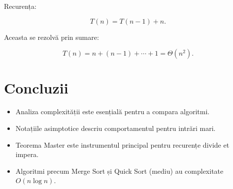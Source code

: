 \documentclass[12pt]{article}
\begin{document}
Recurența:


\[
T(n) = T(n-1) + n.
\]



Aceasta se rezolvă prin sumare:


\[
T(n) = n + (n-1) + \cdots + 1 = \Theta(n^2).
\]



\section{Concluzii}

\begin{itemize}
    \item Analiza complexității este esențială pentru a compara algoritmi.
    \item Notațiile asimptotice descriu comportamentul pentru intrări mari.
    \item Teorema Master este instrumentul principal pentru recurențe divide et impera.
    \item Algoritmi precum Merge Sort și Quick Sort (mediu) au complexitate $O(n\log n)$.
\end{itemize}
\end{document}
